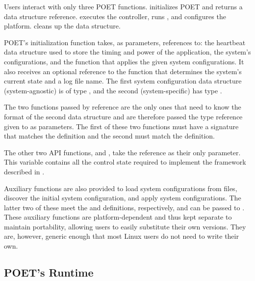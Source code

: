 Users interact with only three POET functions.
 initializes POET and returns a  data structure reference.
 executes the controller, runs , and configures the platform.
 cleans up the  data structure.

POET's initialization function takes, as parameters, references to: the heartbeat data structure used to store the timing and power of the application, the system's configurations, and the function that applies the given system configurations.
It also receives an optional reference to the function that determines the system's current state and a log file name.
The first system configuration data structure (system-agnostic) is of type , and the second (system-specific) has type .

The two functions passed by reference are the only ones that need to know the format of the second data structure and are therefore passed the  type reference given to  as parameters.
The first of these two functions must have a signature that matches the  definition and the second must match the  definition.

The other two API functions,  and , take the  reference as their only parameter.
This variable contains all the control state required to implement the framework described in .

Auxiliary functions are also provided to load system configurations from files, discover the initial system configuration, and apply system configurations.
The latter two of these meet the  and  definitions, respectively, and can be passed to .
These auxiliary functions are platform-dependent and thus kept separate to maintain portability, allowing users to easily substitute their own versions.
They are, however, generic enough that most Linux users do not need to write their own.


\subsection{POET's Runtime}

